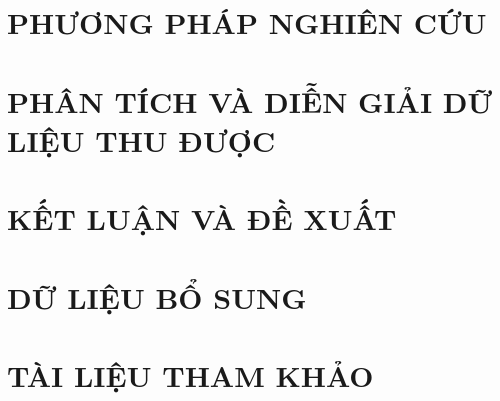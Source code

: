 \documentclass[conference]{IEEEtran}
\begin{document}
\section{PHƯƠNG PHÁP NGHIÊN CỨU}


\section{PHÂN TÍCH VÀ DIỄN GIẢI DỮ LIỆU THU ĐƯỢC}


\section{KẾT LUẬN VÀ ĐỀ XUẤT}

\section{DỮ LIỆU BỔ SUNG}

\section{TÀI LIỆU THAM KHẢO}
\end{document}
